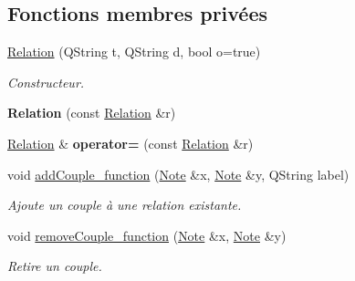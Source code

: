 \subsection*{Fonctions membres privées}
\begin{DoxyCompactItemize}
\item 
\hyperlink{class_relation_ae9c1a5709a34f4103fc82e35c22586fd}{Relation} (Q\-String t, Q\-String d, bool o=true)
\begin{DoxyCompactList}\small\item\em Constructeur. \end{DoxyCompactList}\item 
\hypertarget{class_relation_ae0acb9be133df505efbfe7c9db8a8821}{{\bfseries Relation} (const \hyperlink{class_relation}{Relation} \&r)}\label{class_relation_ae0acb9be133df505efbfe7c9db8a8821}

\item 
\hypertarget{class_relation_a18778458f8d147800e571c7ab03d36d7}{\hyperlink{class_relation}{Relation} \& {\bfseries operator=} (const \hyperlink{class_relation}{Relation} \&r)}\label{class_relation_a18778458f8d147800e571c7ab03d36d7}

\item 
void \hyperlink{class_relation_aada545a51917037591b80640ba7bc792}{add\-Couple\-\_\-function} (\hyperlink{class_note}{Note} \&x, \hyperlink{class_note}{Note} \&y, Q\-String label)
\begin{DoxyCompactList}\small\item\em Ajoute un couple à une relation existante. \end{DoxyCompactList}\item 
void \hyperlink{class_relation_aab0ba1f02226624304cef8c5c52ee579}{remove\-Couple\-\_\-function} (\hyperlink{class_note}{Note} \&x, \hyperlink{class_note}{Note} \&y)
\begin{DoxyCompactList}\small\item\em Retire un couple. \end{DoxyCompactList}\end{DoxyCompactItemize}
